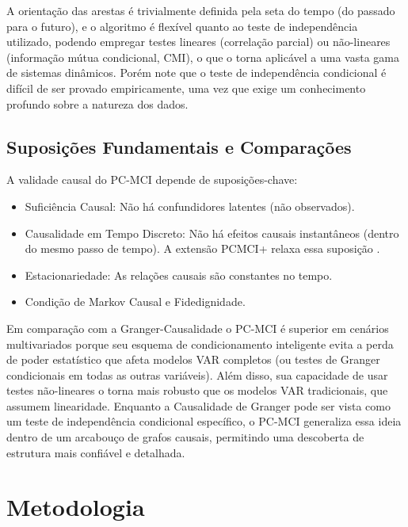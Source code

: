 \documentclass[12pt, a4paper]{article}
\begin{document}
A orientação das arestas é trivialmente definida pela seta do tempo (do passado para o futuro), e o algoritmo é flexível quanto ao teste de independência utilizado, podendo empregar testes lineares (correlação parcial) ou não-lineares (informação mútua condicional, CMI), o que o torna aplicável a uma vasta gama de sistemas dinâmicos. Porém note que o teste de independência condicional é difícil de ser provado empiricamente, uma vez que exige um conhecimento profundo sobre a natureza dos dados. 

\subsection*{Suposições Fundamentais e Comparações}

A validade causal do PC-MCI depende de suposições-chave:
\begin{itemize}
    \item Suficiência Causal: Não há confundidores latentes (não observados).
    \item Causalidade em Tempo Discreto: Não há efeitos causais instantâneos (dentro do mesmo passo de tempo). A extensão PCMCI+ relaxa essa suposição \cite{runge2020}.
    \item Estacionariedade: As relações causais são constantes no tempo.
    \item Condição de Markov Causal e Fidedignidade.
\end{itemize}

Em comparação com a Granger-Causalidade o PC-MCI é superior em cenários multivariados porque seu esquema de condicionamento inteligente evita a perda de poder estatístico que afeta modelos VAR completos (ou testes de Granger condicionais em todas as outras variáveis). Além disso, sua capacidade de usar testes não-lineares o torna mais robusto que os modelos VAR tradicionais, que assumem linearidade. Enquanto a Causalidade de Granger pode ser vista como um teste de independência condicional específico, o PC-MCI generaliza essa ideia dentro de um arcabouço de grafos causais, permitindo uma descoberta de estrutura mais confiável e detalhada.


\section{Metodologia}
\end{document}
